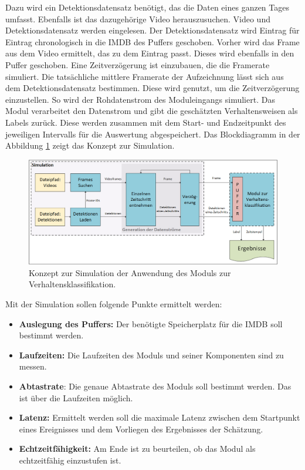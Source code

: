 Dazu wird ein Detektionsdatensatz benötigt, das die Daten eines ganzen Tages umfasst. Ebenfalls ist das dazugehörige Video herauszusuchen. Video und Detektionsdatensatz werden eingelesen. Der Detektionsdatensatz wird Eintrag für Eintrag chronologisch in die \gls{IMDB} des Puffers geschoben. Vorher wird das Frame aus dem Video ermittelt, das zu dem Eintrag passt. Dieses wird ebenfalls in den Puffer geschoben. Eine Zeitverzögerung ist einzubauen, die die Framerate simuliert. Die tatsächliche mittlere Framerate der Aufzeichnung lässt sich aus dem Detektionsdatensatz bestimmen. Diese wird genutzt, um die Zeitverzögerung einzustellen. So wird der Rohdatenstrom des Moduleingangs simuliert. Das Modul verarbeitet den Datenstrom und gibt die geschätzten Verhaltensweisen als Labels zurück. Diese werden zusammen mit dem Start- und Endzeitpunkt des jeweiligen Intervalls für die Auswertung abgespeichert. Das Blockdiagramm in der Abbildung \ref{fig:ModulKonzeptSim} zeigt das Konzept zur Simulation. 

\begin{figure}[htb]
    \centering
    \includegraphics[width=\textwidth]{img/Grafiken/Konzept Simultaion.png}
    \caption[Konzept zur Simulation der Anwendung des Moduls zur Verhaltensklassifikation.]{Konzept zur Simulation der Anwendung des Moduls zur Verhaltensklassifikation.}
    \label{fig:ModulKonzeptSim}
\end{figure}

Mit der Simulation sollen folgende Punkte ermittelt werden:

\begin{itemize}
    \item \textbf{Auslegung des Puffers:} Der benötigte Speicherplatz für die \gls{IMDB} soll bestimmt werden.
    \item \textbf{Laufzeiten:} Die Laufzeiten des Moduls und seiner Komponenten sind zu messen.
    \item \textbf{Abtastrate}: Die genaue Abtastrate des Moduls soll bestimmt werden. Das ist über die Laufzeiten möglich.
    \item \textbf{Latenz:} Ermittelt werden soll die maximale Latenz zwischen dem Startpunkt eines Ereignisses und dem Vorliegen des Ergebnisses der Schätzung.
    \item \textbf{Echtzeitfähigkeit:} Am Ende ist zu beurteilen, ob das Modul als echtzeitfähig einzustufen ist.
\end{itemize}
